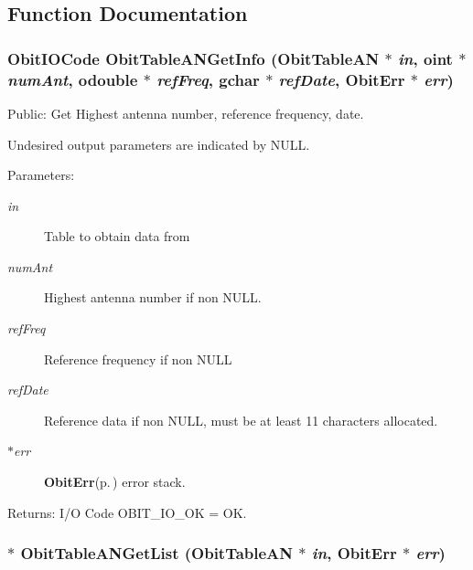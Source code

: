 \subsection{Function Documentation}
\subsubsection{\setlength{\rightskip}{0pt plus 5cm}Obit\-IOCode Obit\-Table\-ANGet\-Info ({\bf Obit\-Table\-AN} $\ast$ {\em in}, {\bf oint} $\ast$ {\em num\-Ant}, {\bf odouble} $\ast$ {\em ref\-Freq}, gchar $\ast$ {\em ref\-Date}, {\bf Obit\-Err} $\ast$ {\em err})}\label{ObitTableANUtil_8c_a0}


Public: Get Highest antenna number, reference frequency, date. 

Undesired output parameters are indicated by NULL. \begin{Desc}
\item[Parameters:]
\begin{description}
\item[{\em in}]Table to obtain data from \item[{\em num\-Ant}]Highest antenna number if non NULL. \item[{\em ref\-Freq}]Reference frequency if non NULL \item[{\em ref\-Date}]Reference data if non NULL, must be at least 11 characters allocated. \item[{\em $\ast$err}]{\bf Obit\-Err}{\rm (p.\,\pageref{structObitErr})} error stack. \end{description}
\end{Desc}
\begin{Desc}
\item[Returns:]I/O Code OBIT\_\-IO\_\-OK = OK. \end{Desc}
\subsubsection{$\ast$ Obit\-Table\-ANGet\-List ({\bf Obit\-Table\-AN} $\ast$ {\em in}, {\bf Obit\-Err} $\ast$ {\em err})}\label{ObitTableANUtil_8c_a1}


